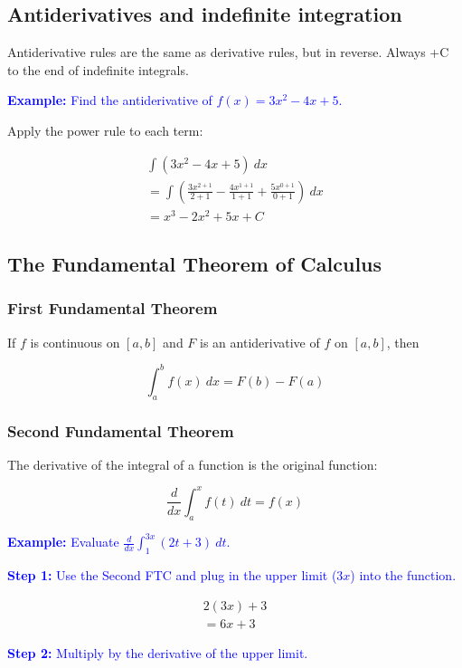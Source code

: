 \documentclass[letterpaper, 12pt]{article}
\newcommand{\example}[1]{\textcolor{blue}{\textbf{Example:} #1}}
\newcommand{\step}[2]{\textcolor{blue}{\textbf{Step #1:} #2}}
\begin{document}
\subsection*{Antiderivatives and indefinite integration}

Antiderivative rules are the same as derivative rules, but in reverse. Always +C to the end of indefinite integrals.

\example{Find the antiderivative of $\displaystyle f(x) = 3x^2 - 4x + 5$.}

Apply the power rule to each term:

\begin{gather*}
\int (3x^2 - 4x + 5) \: dx \\
= \int (\frac{3x^{2+1}}{2+1} - \frac{4x^{1+1}}{1+1} + \frac{5x^{0+1}}{0+1}) \: dx \\
= \boxed{x^3 - 2x^2 + 5x + C}
\end{gather*}

\subsection*{The Fundamental Theorem of Calculus}

\subsubsection*{First Fundamental Theorem}

If $f$ is continuous on $[a, b]$ and $F$ is an antiderivative of $f$ on $[a, b]$, then

$$\int_{a}^{b} f(x) \: dx = F(b) - F(a)$$

\subsubsection*{Second Fundamental Theorem}

The derivative of the integral of a function is the original function:

$$\frac{d}{dx} \int_{a}^{x} f(t) \: dt = f(x)$$

\example{Evaluate $\displaystyle \frac{d}{dx} \int_{1}^{3x} (2t + 3) \: dt$.}

\step{1}{Use the Second FTC and plug in the upper limit ($3x$) into the function.}

\begin{gather*}
2(3x)+3 \\
= 6x + 3
\end{gather*}

\step{2}{Multiply by the derivative of the upper limit.}
\end{document}
